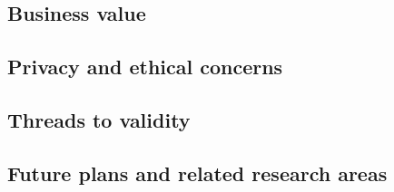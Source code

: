 
\subsection{Business value}

\subsection{Privacy and ethical concerns}

\subsection{Threads to validity}

\subsection{Future plans and related research areas}
